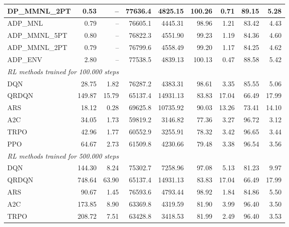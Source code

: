 \begin{samepage}
\begin{center}
\begin{tabular}{l|rr|rr|rr|rr}
    DP\_MMNL\_2PT &     0.53 &    -- &    77636.4 &    4825.15 &  100.26 &    0.71 &   89.15 &    5.28 \\
    \midrule
    ADP\_MNL     &     0.79 &    -- &    76605.1 &    4445.31 &   98.96 &    1.21 &   83.42 &    4.43 \\
    ADP\_MMNL\_5PT &     0.80 &    -- &    76822.3 &    4551.90 &   99.23 &    1.19 &   84.36 &    4.60 \\
    ADP\_MMNL\_2PT &     0.79 &    -- &    76799.6 &    4558.49 &   99.20 &    1.17 &   84.25 &    4.62 \\
    ADP\_ENV     &     2.80 &    -- &    77538.5 &    4839.13 &  100.13 &    0.47 &   88.58 &    5.42 \\
    \midrule
    \multicolumn{9}{l}{\textit{RL methods trained for 100.000 steps}} \\
    \midrule
    DQN          &    28.75 &     1.82 &    76287.2 &    4383.31 &   98.61 &    3.35 &   85.55 &    5.06 \\
    QRDQN        &   149.87 &    15.79 &    65137.4 &   14931.13 &   83.83 &   17.04 &   66.49 &   17.99 \\
    ARS          &    18.12 &     0.28 &    69625.8 &   10735.92 &   90.03 &   13.26 &   73.41 &   14.10 \\
    A2C          &    34.05 &     1.73 &    59819.2 &    3146.82 &   77.36 &    3.27 &   96.72 &    3.12 \\
    TRPO         &    42.96 &     1.77 &    60552.9 &    3255.91 &   78.32 &    3.42 &   96.65 &    3.44 \\
    PPO          &    64.67 &     2.73 &    61509.8 &    4230.66 &   79.48 &    3.38 &   96.54 &    3.56 \\
    \midrule
    \multicolumn{9}{l}{\textit{RL methods trained for 500.000 steps}} \\
    \midrule
    DQN          &   144.30 &     8.24 &    75302.7 &    7258.96 &   97.08 &    5.13 &   81.23 &    9.97 \\
    QRDQN        &   748.64 &    63.90 &    65137.4 &   14931.13 &   83.83 &   17.04 &   66.49 &   17.99 \\
    ARS          &    90.67 &     1.45 &    76593.6 &    4793.44 &   98.92 &    1.84 &   84.86 &    5.50 \\
    A2C          &   173.85 &     8.90 &    63369.8 &    4319.59 &   81.90 &    3.99 &   96.40 &    3.50 \\
    TRPO         &   208.72 &     7.51 &    63428.8 &    3418.53 &   81.99 &    2.49 &   96.40 &    3.53 \\

\end{tabular}
\end{center}
\end{samepage}
